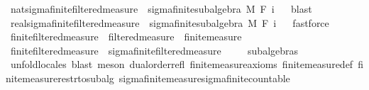 \begin{isabellebody}
\isanewline
{}\isamarkupfalse%
\ nat{\isacharunderscore}{\kern0pt}sigma{\isacharunderscore}{\kern0pt}finite{\isacharunderscore}{\kern0pt}filtered{\isacharunderscore}{\kern0pt}measure\ {\isasymsubseteq}\ sigma{\isacharunderscore}{\kern0pt}finite{\isacharunderscore}{\kern0pt}subalgebra\ M\ {\isachardoublequoteopen}F\ i{\isachardoublequoteclose}%
\isadelimproof
\ %
\endisadelimproof
%
\isatagproof
{}\isamarkupfalse%
\ blast%
\endisatagproof
{\isafoldproof}%
%
\isadelimproof
%
\endisadelimproof
\isanewline
{}\isamarkupfalse%
\ real{\isacharunderscore}{\kern0pt}sigma{\isacharunderscore}{\kern0pt}finite{\isacharunderscore}{\kern0pt}filtered{\isacharunderscore}{\kern0pt}measure\ {\isasymsubseteq}\ sigma{\isacharunderscore}{\kern0pt}finite{\isacharunderscore}{\kern0pt}subalgebra\ M\ {\isachardoublequoteopen}F\ {\isasymbar}i{\isasymbar}{\isachardoublequoteclose}%
\isadelimproof
\ %
\endisadelimproof
%
\isatagproof
{}\isamarkupfalse%
\ fastforce%
\endisatagproof
{\isafoldproof}%
%
\isadelimproof
%
\endisadelimproof
%
\isadelimdocument
%
\endisadelimdocument
%
\isatagdocument
%
\isamarkuptrue%
%
\endisatagdocument
{\isafolddocument}%
%
\isadelimdocument
%
\endisadelimdocument
{}\isamarkupfalse%
\ finite{\isacharunderscore}{\kern0pt}filtered{\isacharunderscore}{\kern0pt}measure\ {\isacharequal}{\kern0pt}\ filtered{\isacharunderscore}{\kern0pt}measure\ {\isacharplus}{\kern0pt}\ finite{\isacharunderscore}{\kern0pt}measure\isanewline
\isanewline
{}\isamarkupfalse%
\ finite{\isacharunderscore}{\kern0pt}filtered{\isacharunderscore}{\kern0pt}measure\ {\isasymsubseteq}\ sigma{\isacharunderscore}{\kern0pt}finite{\isacharunderscore}{\kern0pt}filtered{\isacharunderscore}{\kern0pt}measure\ \isanewline
%
\isadelimproof
\ \ %
\endisadelimproof
%
\isatagproof
{}\isamarkupfalse%
\ subalgebras\ \isamarkupfalse%
\ {\isacharparenleft}{\kern0pt}unfold{\isacharunderscore}{\kern0pt}locales{\isacharcomma}{\kern0pt}\ blast{\isacharcomma}{\kern0pt}\ meson\ dual{\isacharunderscore}{\kern0pt}order{\isachardot}{\kern0pt}refl\ finite{\isacharunderscore}{\kern0pt}measure{\isacharunderscore}{\kern0pt}axioms\ finite{\isacharunderscore}{\kern0pt}measure{\isacharunderscore}{\kern0pt}def\ finite{\isacharunderscore}{\kern0pt}measure{\isacharunderscore}{\kern0pt}restr{\isacharunderscore}{\kern0pt}to{\isacharunderscore}{\kern0pt}subalg\ sigma{\isacharunderscore}{\kern0pt}finite{\isacharunderscore}{\kern0pt}measure{\isachardot}{\kern0pt}sigma{\isacharunderscore}{\kern0pt}finite{\isacharunderscore}{\kern0pt}countable{\isacharparenright}{\kern0pt}%

\end{isabellebody}
